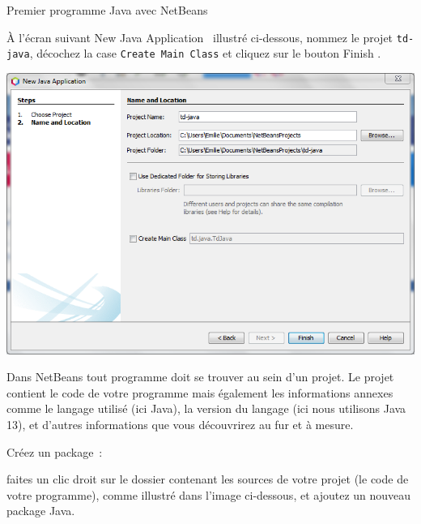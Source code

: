 \documentclass[a4paper,11pt]{style-esi/td}
\begin{document}
\begin{Tutoriel}{Premier programme Java avec NetBeans}
\begin{steps}
		À l'écran suivant \og New Java Application \fg~illustré ci-dessous,
		nommez le projet \texttt{td-java}, décochez la case \texttt{Create Main Class} et cliquez sur le bouton \og Finish \fg.

		\begin{center}
			\includegraphics[width=.9\textwidth]{images/anb113_newproject_name}
		\end{center}
\newpage
		Dans NetBeans tout programme doit se trouver au sein d'un projet.
		Le projet contient le code de votre programme mais également les
		informations annexes comme le langage utilisé (ici Java),
		la version du langage (ici nous utilisons Java 13),
		et d'autres informations que vous découvrirez au fur et à mesure.



		\item Créez un package~:

		faites un clic droit sur le dossier contenant les sources de votre projet
		(le code de votre programme), comme illustré dans l'image ci-dessous,
		et ajoutez un nouveau package Java.


\end{steps}
\end{Tutoriel}
\end{document}
